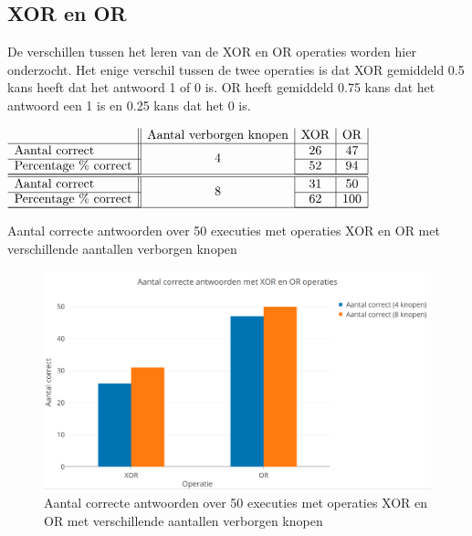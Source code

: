 \subsection{XOR en OR}
De verschillen tussen het leren van de XOR en OR operaties worden hier onderzocht. Het enige verschil tussen de twee operaties is dat XOR gemiddeld 0.5 kans heeft dat het antwoord 1 of 0 is. OR heeft gemiddeld 0.75 kans dat het antwoord een 1 is en 0.25 kans dat het 0 is.

\begin{table}[ht]
    \centering
      $\begin{array}{l || c | c | c | c}
                                    & \text{Aantal verborgen knopen} & \text{XOR} & \text{OR} \\ \hline
        \text{Aantal correct}       & \multirow{2}{*}{4}  & 26 & 47 \\ \cline{1-1} \cline{3-4}
        \text{Percentage \% correct} &                    & 52 & 94 \\ \cline{1-1} \cline{3-4} \hline \hline
        \text{Aantal correct}       & \multirow{2}{*}{8} & 31 & 50 \\ \cline{1-1} \cline{3-4}
        \text{Percentage \% correct} &                    & 62 & 100 \\ \cline{1-1} \cline{3-4} \hline
      \end{array}$
    \caption{Aantal correcte antwoorden over 50 executies met operaties XOR en OR met verschillende aantallen verborgen knopen}
    \label{tab:xoror}
\end{table}

\begin{figure}[ht!]
    \centering
    \includegraphics[scale=0.3]{graphs/xoror.png}
    \caption{Aantal correcte antwoorden over 50 executies met operaties XOR en OR met verschillende aantallen verborgen knopen}
    \label{fig:xoror}
\end{figure}

